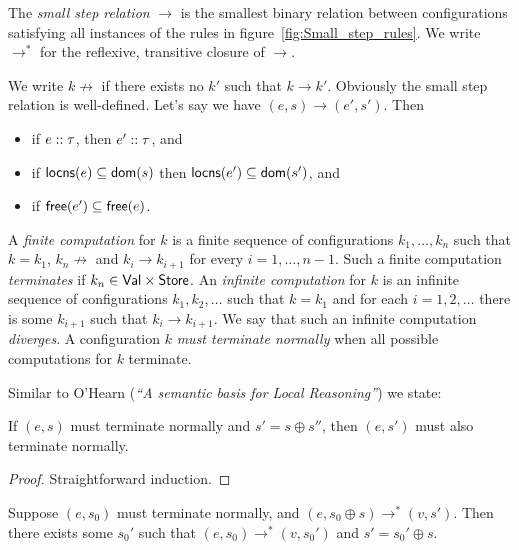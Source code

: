 \documentclass[12pt,a4paper]{article}
\begin{document}
\begin{definition}
  The {\em small step relation} $\to$ is the smallest binary relation between configurations
  satisfying all instances of the rules in figure~\ref{fig:Small_step_rules}. We write $\to^*$ for
  the reflexive, transitive closure of $\to$.
\end{definition}

We write $k \not\to$ if there exists no $k'$ such that $k \to k'$.
Obviously the small step relation is well-defined. Let's say we have $(e,s)\to(e',s')$. Then
\begin{itemize}
\item if ${e}\mathrel{::}{\tau}$, then ${e'}\mathrel{::}{\tau}$, and
\item if $\mathsf{locns}(e) \subseteq \mathsf{dom}(s)$ then $\mathsf{locns}(e') \subseteq \mathsf{dom}(s')$, and
\item if $\mathsf{free}(e') \subseteq \mathsf{free}(e)$.
\end{itemize}

A {\em finite computation} for $k$ is a finite sequence of configurations $k_1,\ldots,k_n$
such that $k = k_1$, $k_n \not\to$ and $k_i \to k_{i+1}$ for every $i=1,\ldots,n-1$. Such a
finite computation {\em terminates} if $k_n \in \mathsf{Val}\times\mathsf{Store}$.
An {\em infinite computation} for $k$ is an infinite sequence of configurations $k_1,k_2,\ldots$
such that $k=k_1$ and for each $i=1,2,\ldots$ there is some $k_{i+1}$ such that $k_i \to k_{i+1}$.
We say that such an infinite computation {\em diverges}.
A configuration $k$ {\em must terminate normally} when all possible computations for $k$ terminate.

Similar to O'Hearn ({\em ``A semantic basis for Local Reasoning''}) we state:

\begin{lemma} \label{lemma:Termination_Monotonicity}
  If $(e,s)$ must terminate normally and $s' = s \oplus s''$, then $(e,s')$ must also terminate normally.
\end{lemma}

\begin{proof}
  Straightforward induction.
\end{proof}

\begin{lemma} \label{lemma:Frame_Property}
  Suppose $(e,s_0)$ must terminate normally, and $(e,s_0 \oplus s) \to^* (v,s')$. Then there exists some
  $s_0'$ such that $(e,s_0) \to^* (v,s_0')$ and $s' = s_0' \oplus s$.
\end{lemma}
\end{document}
